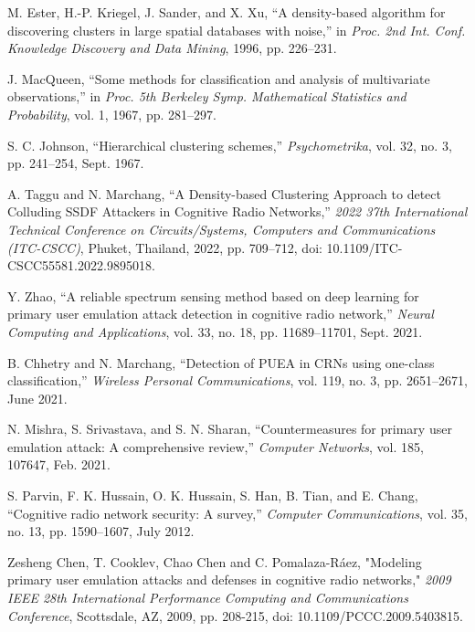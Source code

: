 \documentclass[pdflatex,sn-mathphys-num]{sn-jnl}%
\theoremstyle{thmstyleone}
\theoremstyle{thmstyletwo}
\theoremstyle{thmstylethree}
\begin{document}
\begin{thebibliography}{25}
M. Ester, H.-P. Kriegel, J. Sander, and X. Xu, ``A density-based algorithm for discovering clusters in large spatial databases with noise,'' in \emph{Proc. 2nd Int. Conf. Knowledge Discovery and Data Mining}, 1996, pp. 226--231.

J. MacQueen, ``Some methods for classification and analysis of multivariate observations,'' in \emph{Proc. 5th Berkeley Symp. Mathematical Statistics and Probability}, vol. 1, 1967, pp. 281--297.

S. C. Johnson, ``Hierarchical clustering schemes,'' \emph{Psychometrika}, vol. 32, no. 3, pp. 241--254, Sept. 1967.

A. Taggu and N. Marchang, ``A Density-based Clustering Approach to detect Colluding SSDF Attackers in Cognitive Radio Networks,'' \emph{2022 37th International Technical Conference on Circuits/Systems, Computers and Communications (ITC-CSCC)}, Phuket, Thailand, 2022, pp. 709--712, doi: 10.1109/ITC-CSCC55581.2022.9895018.

Y. Zhao, ``A reliable spectrum sensing method based on deep learning for primary user emulation attack detection in cognitive radio network,'' \emph{Neural Computing and Applications}, vol. 33, no. 18, pp. 11689--11701, Sept. 2021.

B. Chhetry and N. Marchang, ``Detection of PUEA in CRNs using one-class classification,'' \emph{Wireless Personal Communications}, vol. 119, no. 3, pp. 2651--2671, June 2021.

N. Mishra, S. Srivastava, and S. N. Sharan, ``Countermeasures for primary user emulation attack: A comprehensive review,'' \emph{Computer Networks}, vol. 185, 107647, Feb. 2021.

S. Parvin, F. K. Hussain, O. K. Hussain, S. Han, B. Tian, and E. Chang, ``Cognitive radio network security: A survey,'' \emph{Computer Communications}, vol. 35, no. 13, pp. 1590--1607, July 2012.

Zesheng Chen, T. Cooklev, Chao Chen and C. Pomalaza-Ráez, "Modeling primary user emulation attacks and defenses in cognitive radio networks," \emph{2009 IEEE 28th International Performance Computing and Communications Conference}, Scottsdale, AZ, 2009, pp. 208-215, doi: 10.1109/PCCC.2009.5403815.

\end{thebibliography}
\end{document}
